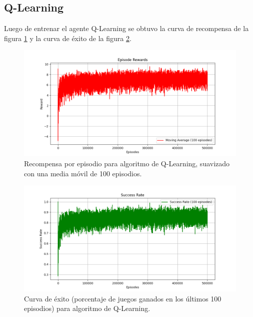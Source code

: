 \subsection{Q-Learning}

Luego de entrenar el agente Q-Learning se obtuvo la curva de recompensa de la figura \ref{fig:q_learning_episode_rewards}  y la curva de éxito de la figura \ref{fig:q_learning_success_rate}.

\clearpage

\begin{figure}[htbp]
	\centering
	\includegraphics[width=\textwidth]{./Figures/q_learning_episode_rewards.png}
	\caption{Recompensa por episodio para algoritmo de Q-Learning, suavizado con una media móvil de 100 episodios.}
	\label{fig:q_learning_episode_rewards}
\end{figure}

\begin{figure}[htbp]
	\centering
	\includegraphics[width=\textwidth]{./Figures/q_learning_success_rate.png}
	\caption{Curva de éxito (porcentaje de juegos ganados en los últimos 100 episodios) para algoritmo de Q-Learning.}
	\label{fig:q_learning_success_rate}
\end{figure}

